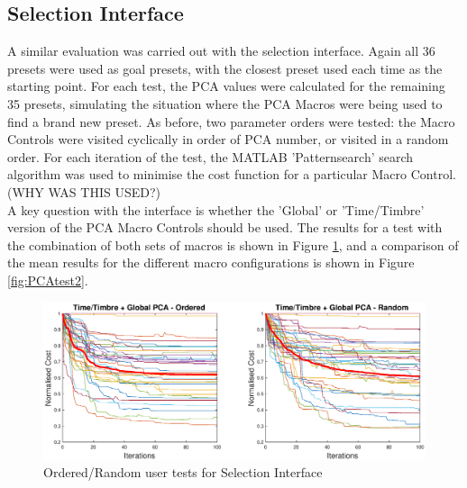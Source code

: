\documentclass[11pt, oneside]{report}   	%
\begin{document}
\subsection{Selection Interface}\label{sec:SelectionEval}
A similar evaluation was carried out with the selection interface. Again all 36 presets were used as goal presets, with the closest preset used each time as the starting point. For each test, the PCA values were calculated for the remaining 35 presets, simulating the situation where the PCA Macros were being used to find a brand new preset. As before, two parameter orders were tested: the Macro Controls were visited cyclically in order of PCA number, or visited in a random order. For each iteration of the test, the MATLAB 'Patternsearch' search algorithm was used to minimise the cost function for a particular Macro Control. (WHY WAS THIS USED?)\\ 
A key question with the interface is whether the 'Global' or 'Time/Timbre' version of the PCA Macro Controls should be used. The results for a test with the combination of both sets of macros is shown in Figure \ref{fig:PCAtest1}, and a comparison of the mean results for the different macro configurations is shown in Figure \ref{fig:PCAtest2}.
\begin{figure}

\hspace{-60pt}
	\includegraphics[width = 8in]{PCAInterfaceTests1.eps}
	\caption{Ordered/Random user tests for Selection Interface}
	\label{fig:PCAtest1}
\end{figure}
\end{document}
